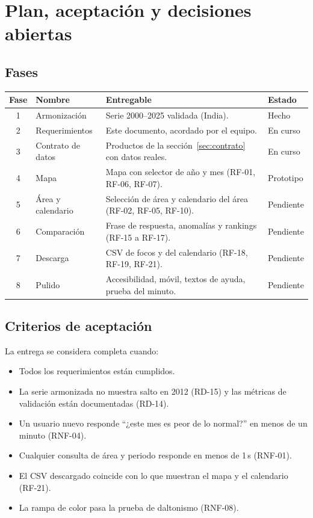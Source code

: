 \chapter{Plan, aceptación y decisiones abiertas}\label{cap:plan}

\section{Fases}

\begin{tabularx}{\linewidth}{@{}clXl@{}}
\toprule
Fase & Nombre & Entregable & Estado \\
\midrule
1 & Armonización & Serie 2000--2025 validada (India). & Hecho \\
2 & Requerimientos & Este documento, acordado por el equipo. & En curso \\
3 & Contrato de datos & Productos de la sección~\ref{sec:contrato} con datos reales. & En curso \\
4 & Mapa & Mapa con selector de año y mes (RF-01, RF-06, RF-07). & Prototipo \\
5 & Área y calendario & Selección de área y calendario del área (RF-02, RF-05, RF-10). & Pendiente \\
6 & Comparación & Frase de respuesta, anomalías y rankings (RF-15 a RF-17). & Pendiente \\
7 & Descarga & CSV de focos y del calendario (RF-18, RF-19, RF-21). & Pendiente \\
8 & Pulido & Accesibilidad, móvil, textos de ayuda, prueba del minuto. & Pendiente \\
\bottomrule
\end{tabularx}

\section{Criterios de aceptación}

La entrega se considera completa cuando:

\begin{itemize}
  \item Todos los requerimientos \imp{} están cumplidos.
  \item La serie armonizada no muestra salto en 2012 (RD-15) y las métricas de
        validación están documentadas (RD-14).
  \item Un usuario nuevo responde ``¿este mes es peor de lo normal?'' en menos de un
        minuto (RNF-04).
  \item Cualquier consulta de área y periodo responde en menos de 1\,s (RNF-01).
  \item El CSV descargado coincide con lo que muestran el mapa y el calendario (RF-21).
  \item La rampa de color pasa la prueba de daltonismo (RNF-08).
\end{itemize}

